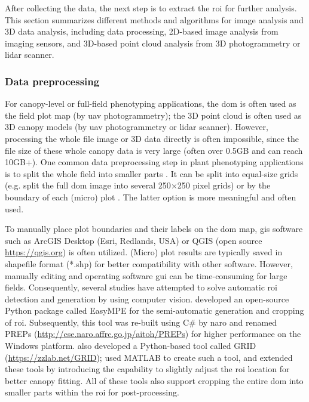 After collecting the data, the next step is to extract the \acrfull{roi} for further analysis. This section summarizes different methods and algorithms for image analysis and 3D data analysis, including data processing, 2D-based image analysis from imaging sensors, and 3D-based point cloud analysis from 3D photogrammetry or \gls{lidar} scanner.

\subsubsection{Data preprocessing} \label{sec:prepro}

For canopy-level or full-field phenotyping applications, the \gls{dom} is often used as the field plot map (by \gls{uav} photogrammetry); the 3D point cloud is often used as 3D canopy models (by \gls{uav} photogrammetry or \gls{lidar} scanner). However, processing the whole file image or 3D data directly is often impossible, since the file size of these whole canopy data is very large (often over 0.5GB and can reach 10GB+). One common data preprocessing step in plant phenotyping applications is to split the whole field into smaller parts \citep{wang_easyidp_2021}. It can be split into equal-size grids (e.g. \citet{bauer_combining_2019} split the full \gls{dom} image into several 250$\times$250 pixel grids) or by the boundary of each (micro) plot \citep{tresch_easympe_2019}. The latter option is more meaningful and often used.

To manually place plot boundaries and their labels on the \gls{dom} map, \gls{gis} software such as ArcGIS Desktop (Esri, Redlands, USA) or QGIS (open source \url{https://qgis.org}) is often utilized. (Micro) plot results are typically saved in shapefile format (*.shp) for better compatibility with other software. However, manually editing and operating software \gls{gui} can be time-consuming for large fields. Consequently, several studies have attempted to solve automatic \gls{roi} detection and generation by using computer vision. \citet{tresch_easympe_2019} developed an open-source Python package called EasyMPE for the semi-automatic generation and cropping of \gls{roi}. Subsequently, this tool was re-built using C\# by \gls{naro} and renamed PREPs (\url{http://cse.naro.affrc.go.jp/aitoh/PREPs}) for higher performance on the Windows platform. \citet{chen_grid_2020} also developed a Python-based tool called GRID (\url{https://zzlab.net/GRID}); \citet{mortensen_drone_2019} used MATLAB to create such a tool, and \citet{sara_automatic_2021} extended these tools by introducing the capability to slightly adjust the \gls{roi} location for better canopy fitting. All of these tools also support cropping the entire \gls{dom} into smaller parts within the \gls{roi} for post-processing.

